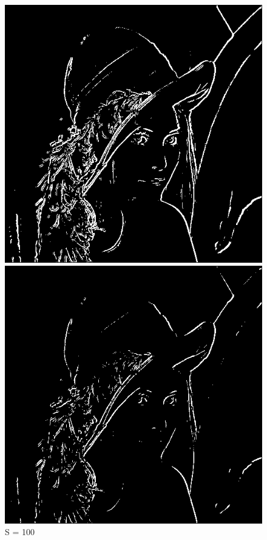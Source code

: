 \documentclass[11pt]{article}
\begin{document}
\begin{figure}[H]
		\begin{minipage}[c]{.30\linewidth}
			\centering
			\includegraphics[scale=0.15]{Image/seuilFixe100.png}
			\caption{S = 100}
			\label{fig:SeuilFixe100}
		\end{minipage} \hfill
		\begin{minipage}[c]{.30\linewidth}
			\centering
			\includegraphics[scale=0.15]{Image/seuilFixe150.png}

\end{minipage}
\end{figure}
\end{document}
